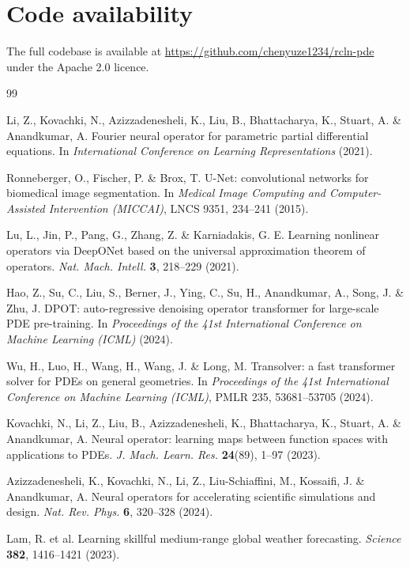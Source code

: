 \documentclass[11pt,a4paper]{article}
\begin{document}
\section*{Code availability}

The full codebase is available at \url{https://github.com/chenyuze1234/rcln-pde} under the Apache 2.0 licence.

\begin{thebibliography}{99}
\footnotesize

 Li, Z., Kovachki, N., Azizzadenesheli, K., Liu, B., Bhattacharya, K., Stuart, A. \& Anandkumar, A. Fourier neural operator for parametric partial differential equations. In \emph{International Conference on Learning Representations} (2021).

 Ronneberger, O., Fischer, P. \& Brox, T. U-Net: convolutional networks for biomedical image segmentation. In \emph{Medical Image Computing and Computer-Assisted Intervention (MICCAI)}, LNCS 9351, 234--241 (2015).

 Lu, L., Jin, P., Pang, G., Zhang, Z. \& Karniadakis, G. E. Learning nonlinear operators via DeepONet based on the universal approximation theorem of operators. \emph{Nat. Mach. Intell.} \textbf{3}, 218--229 (2021).

 Hao, Z., Su, C., Liu, S., Berner, J., Ying, C., Su, H., Anandkumar, A., Song, J. \& Zhu, J. DPOT: auto-regressive denoising operator transformer for large-scale PDE pre-training. In \emph{Proceedings of the 41st International Conference on Machine Learning (ICML)} (2024).

 Wu, H., Luo, H., Wang, H., Wang, J. \& Long, M. Transolver: a fast transformer solver for PDEs on general geometries. In \emph{Proceedings of the 41st International Conference on Machine Learning (ICML)}, PMLR 235, 53681--53705 (2024).

 Kovachki, N., Li, Z., Liu, B., Azizzadenesheli, K., Bhattacharya, K., Stuart, A. \& Anandkumar, A. Neural operator: learning maps between function spaces with applications to PDEs. \emph{J. Mach. Learn. Res.} \textbf{24}(89), 1--97 (2023).

 Azizzadenesheli, K., Kovachki, N., Li, Z., Liu-Schiaffini, M., Kossaifi, J. \& Anandkumar, A. Neural operators for accelerating scientific simulations and design. \emph{Nat. Rev. Phys.} \textbf{6}, 320--328 (2024).

 Lam, R. et al. Learning skillful medium-range global weather forecasting. \emph{Science} \textbf{382}, 1416--1421 (2023).


\end{thebibliography}
\end{document}
